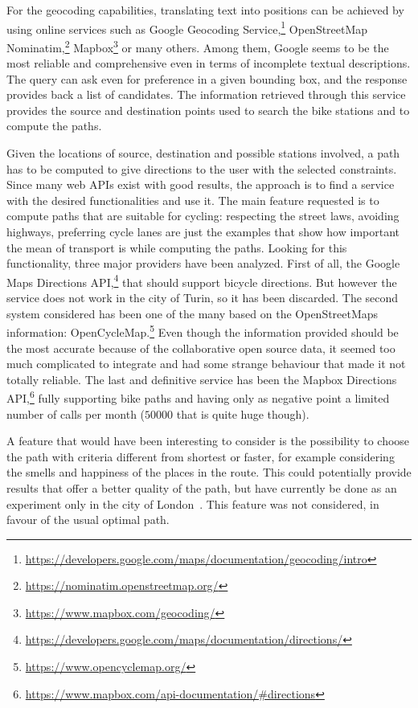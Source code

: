 For the geocoding capabilities, translating text into positions can be achieved by using online services such as Google Geocoding Service,\footnote{\url{https://developers.google.com/maps/documentation/geocoding/intro}} OpenStreetMap Nominatim,\footnote{\url{https://nominatim.openstreetmap.org/}} Mapbox\footnote{\url{https://www.mapbox.com/geocoding/}} or many others. Among them, Google seems to be the most reliable and comprehensive even in terms of incomplete textual descriptions. The query can ask even for preference in a given bounding box, and the response provides back a list of candidates. The information retrieved through this service provides the source and destination points used to search the bike stations and to compute the paths.

Given the locations of source, destination and possible stations involved, a path has to be computed to give directions to the user with the selected constraints. Since many web APIs exist with good results, the approach is to find a service with the desired functionalities and use it. The main feature requested is to compute paths that are suitable for cycling: respecting the street laws, avoiding highways, preferring cycle lanes are just the examples that show how important the mean of transport is while computing the paths. Looking for this functionality, three major providers have been analyzed. First of all, the Google Maps Directions API,\footnote{\url{https://developers.google.com/maps/documentation/directions/}} that should support bicycle directions. But however the service does not work in the city of Turin, so it has been discarded. The second system considered has been one of the many based on the OpenStreetMaps information: OpenCycleMap.\footnote{\url{https://www.opencyclemap.org/}} Even though the information provided should be the most accurate because of the collaborative open source data, it seemed too much complicated to integrate and had some strange behaviour that made it not totally reliable. The last and definitive service has been the Mapbox Directions API,\footnote{\url{https://www.mapbox.com/api-documentation/\#directions}} fully supporting bike paths and having only as negative point a limited number of calls per month ($50000$ that is quite huge though).

A feature that would have been interesting to consider is the possibility to choose the path with criteria different from shortest or faster, for example considering the smells and happiness of the places in the route. This could potentially provide results that offer a better quality of the path, but have currently be done as an experiment only in the city of London~\cite{quercia2015smelly,quercia2016emotional,aiello2016chatty}. This feature was not considered, in favour of the usual optimal path.


